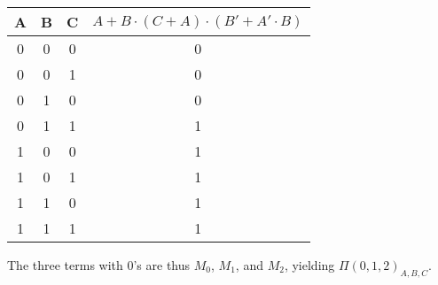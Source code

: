 \begin{tabular}{c|c|c||c}
A & B & C & $A+B\cdot (C + A)\cdot(B'+ A'\cdot B)$ \\
\hline
0 & 0 & 0 & 0 \\
0 & 0 & 1 & 0 \\
0 & 1 & 0 & 0 \\
0 & 1 & 1 & 1 \\
1 & 0 & 0 & 1 \\
1 & 0 & 1 & 1 \\
1 & 1 & 0 & 1 \\
1 & 1 & 1 & 1 \\
\end{tabular}

The three terms with 0's are thus $M_0$, $M_1$, and $M_2$, yielding $\Pi(0,1,2)_{A,B,C}$.

